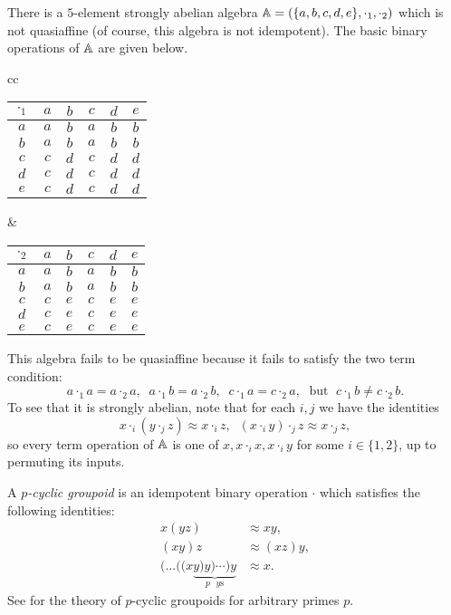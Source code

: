 \begin{appendices}
\begin{ex}\label{ex-strongly-abelian-not-quasiaffine} There is a $5$-element strongly abelian algebra $\mathbb{A} = (\{a,b,c,d,e\},\cdot_1,\cdot_2)$ which is not quasiaffine (of course, this algebra is not idempotent). The basic binary operations of $\mathbb{A}$ are given below.
\begin{center}
\begin{tabular}{cc}
\begin{tabular}{c | c c c c c} $\cdot_1$ & $a$ & $b$ & $c$ & $d$ & $e$\\ \hline $a$ & $a$ & $b$ & $a$ & $b$ & $b$\\ $b$ & $a$ & $b$ & $a$ & $b$ & $b$\\ $c$ & $c$ & $d$ & $c$ & $d$ & $d$\\ $d$ & $c$ & $d$ & $c$ & $d$ & $d$\\ $e$ & $c$ & $d$ & $c$ & $d$ & $d$ \end{tabular} &
\begin{tabular}{c | c c c c c} $\cdot_2$ & $a$ & $b$ & $c$ & $d$ & $e$\\ \hline $a$ & $a$ & $b$ & $a$ & $b$ & $b$\\ $b$ & $a$ & $b$ & $a$ & $b$ & $b$\\ $c$ & $c$ & $e$ & $c$ & $e$ & $e$\\ $d$ & $c$ & $e$ & $c$ & $e$ & $e$\\ $e$ & $c$ & $e$ & $c$ & $e$ & $e$ \end{tabular}
\end{tabular}
\end{center}
This algebra fails to be quasiaffine because it fails to satisfy the two term condition:
\[
a\cdot_1 a = a\cdot_2 a, \;\; a\cdot_1 b = a\cdot_2 b, \;\; c\cdot_1 a = c\cdot_2 a, \;\text{ but }\; c\cdot_1 b \ne c\cdot_2 b.
\]
To see that it is strongly abelian, note that for each $i,j$ we have the identities
\[
x\cdot_i (y\cdot_j z) \approx x\cdot_i z, \;\; (x\cdot_i y)\cdot_j z \approx x\cdot_j z,
\]
so every term operation of $\mathbb{A}$ is one of $x, x \cdot_i x, x \cdot_i y$ for some $i \in \{1,2\}$, up to permuting its inputs.
\end{ex}

\begin{ex} A \emph{$p$-cyclic groupoid} is an idempotent binary operation $\cdot$ which satisfies the following identities:
\begin{align*}
x(yz) &\approx xy,\\
(xy)z &\approx (xz)y,\\
(...((x\underbrace{y)y)\cdots) y}_{p\text{ }y\text{s}} &\approx x.
\end{align*}
See \cite{plonka-p-cyclic} for the theory of $p$-cyclic groupoids for arbitrary primes $p$.


\end{ex}
\end{appendices}
